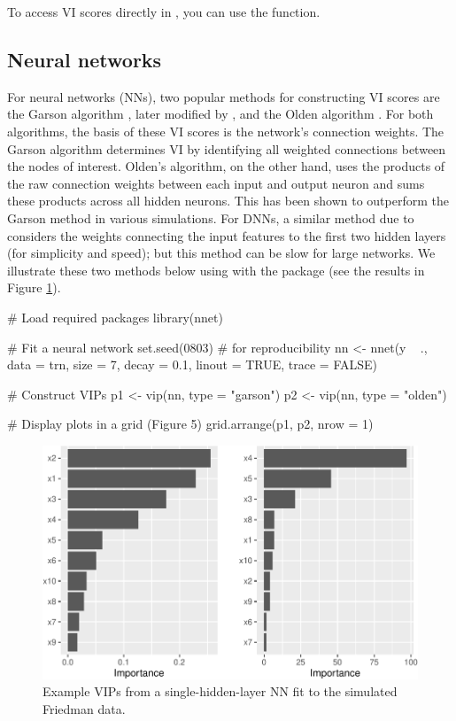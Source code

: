 To access VI scores directly in , you can use the
 function.

\hypertarget{neural-networks}{%
\subsection{Neural networks}\label{neural-networks}}

For neural networks (NNs), two popular methods for constructing VI
scores are the Garson algorithm \citep{interpreting-garson-1991}, later
modified by \citet{back-goh-1995}, and the Olden algorithm
\citep{accurate-olden-2004}. For both algorithms, the basis of these VI
scores is the network's connection weights. The Garson algorithm
determines VI by identifying all weighted connections between the nodes
of interest. Olden's algorithm, on the other hand, uses the products of
the raw connection weights between each input and output neuron and sums
these products across all hidden neurons. This has been shown to
outperform the Garson method in various simulations. For DNNs, a similar
method due to \citet{data-gedeon-1997} considers the weights connecting
the input features to the first two hidden layers (for simplicity and
speed); but this method can be slow for large networks. We illustrate
these two methods below using  with the 
package \citep{R-nnet} (see the results in Figure \ref{fig:vip-nnet}).

\begin{Schunk}
\begin{Sinput}
# Load required packages
library(nnet)

# Fit a neural network
set.seed(0803)  # for reproducibility
nn <- nnet(y ~ ., data = trn, size = 7, decay = 0.1,
           linout = TRUE, trace = FALSE)

# Construct VIPs
p1 <- vip(nn, type = "garson")
p2 <- vip(nn, type = "olden")

# Display plots in a grid (Figure 5)
grid.arrange(p1, p2, nrow = 1)
\end{Sinput}
\begin{figure}[!htb]

{\centering \includegraphics[width=0.7\linewidth]{greenwell-boehmke_files/figure-latex/vip-nnet-1}

}

\caption[Example VIPs from a single-hidden-layer NN fit to the simulated Friedman data]{Example VIPs from a single-hidden-layer NN fit to the simulated Friedman data.}\label{fig:vip-nnet}
\end{figure}
\end{Schunk}

